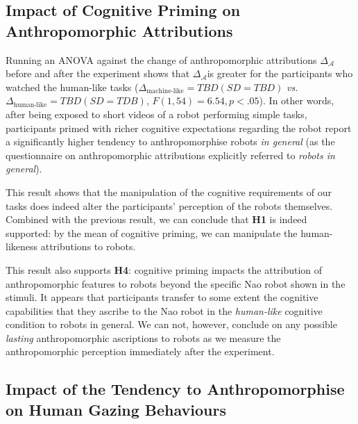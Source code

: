 \documentclass[lettersize, noapacite, twoside, HRI]{apa_HRI}
\newcommand{\vs}{\textit{vs.}\xspace}
\newcommand{\h}[1]{\textbf{H#1}\xspace}
\newcommand{\anti}{{$\mathcal{A}_{start}$\xspace}}
\newcommand{\antf}{{$\mathcal{A}_{end}$\xspace}}
\newcommand{\deltaant}{{$\Delta_{\mathcal{A}}$\xspace}}
\begin{document}
\subsection{Impact of Cognitive Priming on Anthropomorphic Attributions}

Running an ANOVA against the change of anthropomorphic attributions
\deltaant before and after the experiment shows that \deltaant is greater for the participants who watched the
human-like tasks ($\Delta_{\text{machine-like}}=TBD (SD=TBD)$
\vs $\Delta_{\text{human-like}}=TBD (SD=TDB)$, $F(1,54) = 6.54, p < .05$). In other words, after being exposed to short videos of a robot
performing simple tasks, participants primed with richer cognitive
expectations regarding the robot report a significantly higher tendency to anthropomorphise robots
\emph{in general} (as the questionnaire on anthropomorphic attributions
explicitly referred to \emph{robots in general}).

This result shows that the manipulation of the cognitive requirements of our
tasks does indeed alter the participants' perception of the robots themselves.
Combined with the previous result, we can conclude that \h{1} is indeed
supported: by the mean of cognitive priming, we can manipulate the
human-likeness attributions to robots.



This result also supports \h{4}: cognitive priming impacts the
attribution of anthropomorphic features to robots beyond the specific Nao robot
shown in the stimuli. It appears that participants transfer to some extent the
cognitive capabilities that they ascribe to the Nao robot in the
\emph{human-like} cognitive condition to robots in general. We can not, however,
conclude on any possible \emph{lasting} anthropomorphic ascriptions to robots as we
measure the anthropomorphic perception immediately after the experiment.


\subsection{Impact of the Tendency to Anthropomorphise on Human
Gazing Behaviours}
\end{document}
